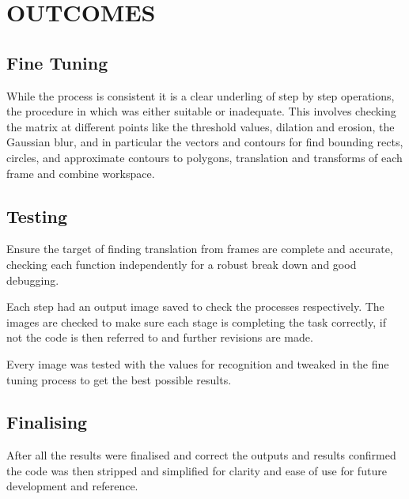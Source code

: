 \documentclass[a4paper, 10pt]{article}
\begin{document}
\section{OUTCOMES}


\subsection{Fine Tuning} 

While the process is consistent it is a clear underling of step by step operations, the procedure in which was either suitable or inadequate. This involves checking the matrix at different points like the threshold values, dilation and erosion, the Gaussian blur, and in particular the vectors and contours for find bounding rects, circles, and approximate contours to polygons, translation and transforms of each frame and combine workspace.


\subsection{Testing}

Ensure the target of finding translation from frames are complete and accurate, checking each function independently for a robust break down and good debugging.

Each step had an output image saved to check the processes respectively. The images are checked to make sure each stage is completing the task correctly, if not the code is then referred to and further revisions are made.

Every image was tested with the values for recognition and tweaked in the fine tuning process to get the best possible results.


\subsection{Finalising}

After all the results were finalised and correct the outputs and results confirmed the code was then stripped and simplified for clarity and ease of use for future development and reference.
\end{document}
